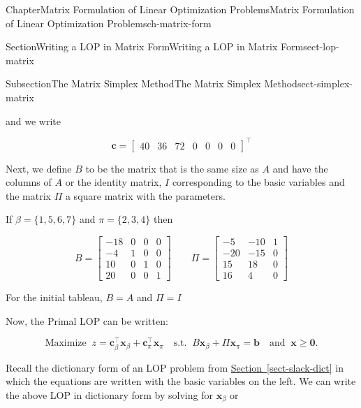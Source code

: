 \documentclass[oneside,10pt,]{book}
\newcommand{\xreffont}{\relax}
\numberwithin{equation}{section}
\newcommand{\amp}{&}
\begin{document}
\begin{chapterptx}{Chapter}{Matrix Formulation of Linear Optimization Problems}{}{Matrix Formulation of Linear Optimization Problems}{}{}{ch-matrix-form}
\begin{sectionptx}{Section}{Writing a LOP in Matrix Form}{}{Writing a LOP in Matrix Form}{}{}{sect-lop-matrix}
\begin{subsectionptx}{Subsection}{The Matrix Simplex Method}{}{The Matrix Simplex Method}{}{}{sect-simplex-matrix}
\begin{equation*}
\end{equation*}
%
\par
and we write%
\par
%
\begin{equation*}
\boldsymbol{c} = \left[\begin{array}{rrr|rrrr} 40 \amp 36 \amp 72 \amp 0 \amp 0 \amp 0 \amp 0 \end{array}\right]^{\intercal}
\end{equation*}
%
\par
Next, we define \(B\) to be the matrix that is the same size as \(A\) and have the columns of \(A\) or the identity matrix, \(I\) corresponding to the basic variables and the matrix \(\Pi\) a square matrix with the parameters.%
\par
If \(\beta=\{1,5,6,7\}\) and \(\pi=\{2,3,4\}\) then%
\par
%
\begin{equation*}
B = \begin{bmatrix} -18 \amp 0 \amp 0 \amp 0 \\ -4 \amp 1 \amp 0 \amp 0 \\ 10 \amp 0 \amp 1 \amp 0 \\ 20 \amp 0 \amp 0 \amp 1 \end{bmatrix} \qquad \Pi = \begin{bmatrix} -5 \amp -10 \amp 1 \\ -20 \amp -15 \amp 0 \\ 15 \amp 18 \amp 0 \\ 16 \amp 4 \amp 0 \end{bmatrix}
\end{equation*}
%
\par
For the initial tableau, \(B = A\) and \(\Pi = I\)%
\par
Now, the Primal LOP can be written:%
\par
%
\begin{equation*}
\text{Maximize}\;\; z = \boldsymbol{c}_{\beta}^{\intercal} \boldsymbol{x}_{\beta}+ \boldsymbol{c}_{\pi}^{\intercal} \boldsymbol{x}_{\pi}\quad \text{s.t.}\;\; B \boldsymbol{x}_{\beta} + \Pi \boldsymbol{x}_{\pi} = \boldsymbol{b}\quad\text{and}\;\; \boldsymbol{x} \geq \boldsymbol{0}.
\end{equation*}
%
\par
Recall the dictionary form of an LOP problem from \hyperref[sect-slack-dict]{Section~{\xreffont\ref{sect-slack-dict}}} in which the equations are written with the basic variables on the left. We can write the above LOP in dictionary form by solving for \(\boldsymbol{x}_{\beta}\) or%

\end{subsectionptx}
\end{sectionptx}
\end{chapterptx}
\end{document}
